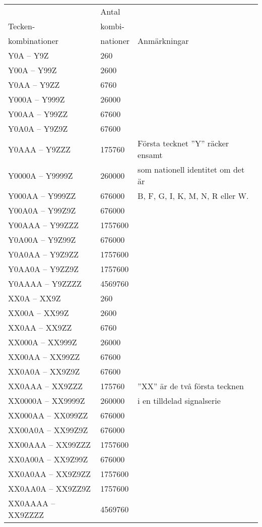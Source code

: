 \begin{tabular}{l|l|l}
                & Antal    &  \\
  Tecken-       & kombi-   &  \\
  kombinationer & nationer & Anmärkningar \\
  \hline
  Y0A -- Y9Z & 260 & \\
  Y00A -- Y99Z & 2600 & \\
  Y0AA -- Y9ZZ & 6760 & \\
  Y000A -- Y999Z & 26000 & \\
  Y00AA -- Y99ZZ & 67600 & \\
  Y0A0A -- Y9Z9Z & 67600 & \\
  Y0AAA -- Y9ZZZ & 175760 & Första tecknet ''Y'' räcker ensamt \\
  Y0000A -- Y9999Z & 260000 & som nationell identitet om det är \\
  Y000AA -- Y999ZZ & 676000 & B, F, G, I, K, M, N, R eller W. \\
  Y00A0A -- Y99Z9Z & 676000 & \\
  Y00AAA -- Y99ZZZ & 1757600 & \\
  Y0A00A -- Y9Z99Z & 676000 & \\
  Y0A0AA -- Y9Z9ZZ & 1757600 & \\
  Y0AA0A -- Y9ZZ9Z & 1757600 & \\
  Y0AAAA -- Y9ZZZZ & 4569760 & \\
  \hline
  XX0A -- XX9Z & 260 & \\
  XX00A -- XX99Z & 2600 & \\
  XX0AA -- XX9ZZ & 6760 & \\
  XX000A -- XX999Z & 26000 & \\
  XX00AA -- XX99ZZ & 67600 & \\
  XX0A0A -- XX9Z9Z & 67600 & \\
  XX0AAA -- XX9ZZZ & 175760 & ''XX'' är de två första tecknen \\
  XX0000A -- XX9999Z & 260000 & i en tilldelad signalserie \\
  XX000AA -- XX099ZZ & 676000 & \\
  XX00A0A -- XX99Z9Z & 676000 & \\
  XX00AAA -- XX99ZZZ & 1757600 & \\
  XX0A00A -- XX9Z99Z & 676000 & \\
  XX0A0AA -- XX9Z9ZZ & 1757600 & \\
  XX0AA0A -- XX9ZZ9Z & 1757600 & \\
  XX0AAAA -- XX9ZZZZ & 4569760 & \\
\end{tabular}

